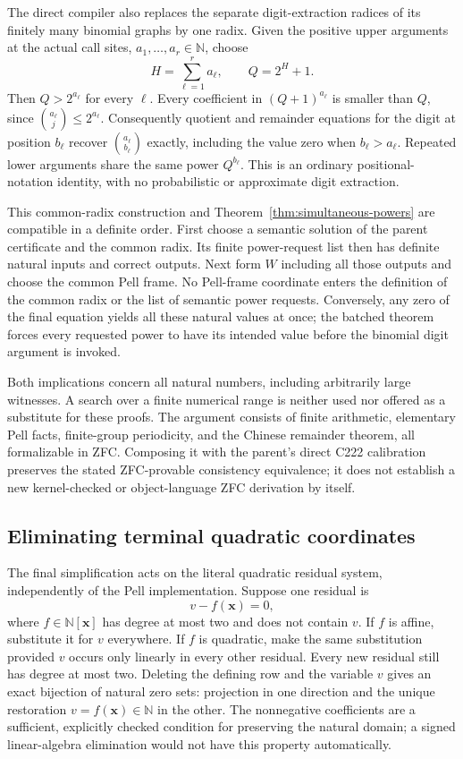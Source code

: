 The direct compiler also replaces the separate digit-extraction radices of
its finitely many binomial graphs by one radix. Given the positive upper arguments at the actual call sites,
$a_1,\ldots,a_r\in\mathbb N$, choose
\[
 H=\sum_{\ell=1}^{r}a_\ell,\qquad Q=2^H+1.
\]
Then $Q>2^{a_\ell}$ for every $\ell$. Every coefficient in
$(Q+1)^{a_\ell}$ is smaller than $Q$, since
$\binom{a_\ell}{j}\leq2^{a_\ell}$. Consequently quotient and remainder
equations for the digit at position $b_\ell$ recover
$\binom{a_\ell}{b_\ell}$ exactly, including the value zero when
$b_\ell>a_\ell$. Repeated lower arguments share the same power
$Q^{b_\ell}$. This is an ordinary positional-notation identity, with no
probabilistic or approximate digit extraction.

This common-radix construction and Theorem~\ref{thm:simultaneous-powers}
are compatible in a definite order. First choose a semantic solution of
the parent certificate and the common radix. Its finite power-request
list then has definite natural inputs and correct outputs. Next form
$W$ including all those outputs and choose the common Pell frame.
No Pell-frame coordinate enters the definition of the common radix or
the list of semantic power requests. Conversely, any zero of the final
equation yields all these natural values at once; the batched theorem
forces every requested power to have its intended value before the
binomial digit argument is invoked.

Both implications concern all natural numbers, including arbitrarily
large witnesses. A search over a finite numerical range is neither used
nor offered as a substitute for these proofs. The argument consists of
finite arithmetic, elementary Pell facts, finite-group periodicity, and
the Chinese remainder theorem, all formalizable in ZFC. Composing it
with the parent's direct C222 calibration preserves the stated
ZFC-provable consistency equivalence; it does not establish a new
kernel-checked or object-language ZFC derivation by itself.

\subsection{Eliminating terminal quadratic coordinates}

The final simplification acts on the literal quadratic residual system,
independently of the Pell implementation. Suppose one residual is
\[
 v-f(\mathbf x)=0,
\]
where $f\in\mathbb N[\mathbf x]$ has degree at most two and does not
contain $v$. If $f$ is affine, substitute it for $v$ everywhere. If $f$
is quadratic, make the same substitution provided $v$ occurs only
linearly in every other residual. Every new residual still has degree
at most two. Deleting the defining row and the variable $v$ gives an
exact bijection of natural zero sets: projection in one direction and
the unique restoration $v=f(\mathbf x)\in\mathbb N$ in the other.
The nonnegative coefficients are a sufficient, explicitly checked
condition for preserving the natural domain; a signed linear-algebra
elimination would not have this property automatically.

